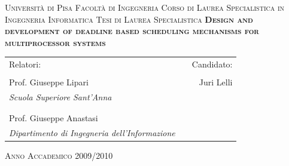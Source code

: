 \thispagestyle{empty}
\begin{center}
  \textsc{\Large Universit\`a di Pisa}
  \vskip3mm
  \textsc{\large Facolt\`a di Ingegneria}
  \vskip3mm
  \textsc{\normalsize Corso di Laurea Specialistica in Ingegneria Informatica}
  \vskip5mm
  \textsc{\large Tesi di Laurea Specialistica}
  \vskip22mm
  \vfill
  \textsc{\textbf{\huge Design and development of deadline based scheduling
mechanisms for multiprocessor systems\\}}
  \vfill
  \vskip22mm

  \begin{tabular*}{\textwidth}{@{\extracolsep{\fill}}lcr}
    Relatori: 				            & \hfill & Candidato: \\
    & & \\
    Prof. Giuseppe Lipari                & \hfill & Juri Lelli \\
    \emph{\scriptsize Scuola Superiore Sant'Anna } & \hfill & \\
    & & \\
    & & \\
    Prof. Giuseppe Anastasi   & \hfill & \\
    \emph{\scriptsize Dipartimento di Ingegneria dell'Informazione }        & \hfill & \\
  \end{tabular*}
  \vskip12mm
  \textsc{\normalsize Anno Accademico 2009/2010}
\end{center}
